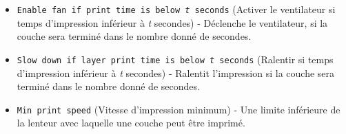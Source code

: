 \begin{itemize}
	\item \texttt{Enable fan if print time is below \textit{t} seconds}  (Activer le ventilateur si temps d'impression inf\'erieur \`a \textit{t} secondes) - D\'eclenche le ventilateur, si la couche sera termin\'e dans le nombre donn\'e de secondes.
	\item \texttt{Slow down if layer print time is below \textit{t} seconds}  (Ralentir si temps d'impression inf\'erieur \`a \textit{t} secondes) - Ralentit l'impression si la couche sera termin\'e dans le nombre donn\'e de secondes.
	\item \texttt{Min print speed}  (Vitesse d'impression minimum) - Une limite inf\'erieure de la lenteur avec laquelle une couche peut \^etre imprim\'e.
\end{itemize}



